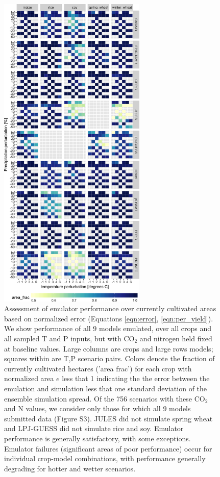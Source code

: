 \documentclass[esd, manuscript]{copernicus} %
\begin{document}
\begin{figure}[ht]
\centering
    \includegraphics[width=7cm]{figures/error_360.png}
    \caption{Assessment of emulator performance over currently cultivated areas based on normalized error (Equations \ref{eqn:error}, \ref{eqn:per_yield}). We show performance of all 9 models emulated, over all crops and all sampled T and P inputs, but with CO$_2$ and nitrogen held fixed at baseline values. Large columns are crops and large rows models; squares within are T,P scenario pairs. Colors denote the fraction of currently cultivated hectares ('area frac') for each crop with normalized area $e$ less that 1 indicating the the error between the emulation and simulation less that one standard deviation of the ensemble simulation spread. Of the 756 scenarios with these CO$_2$ and N values, we consider only those for which all 9 models submitted data (Figure S3). JULES did not simulate spring wheat and LPJ-GUESS did not simulate rice and soy. Emulator performance is generally satisfactory, with some exceptions. Emulator failures (significant areas of poor performance) occur for individual crop-model combinations, with performance generally degrading for hotter and wetter scenarios.}
   \label{fig:error_360}
\end{figure}
\end{document}
